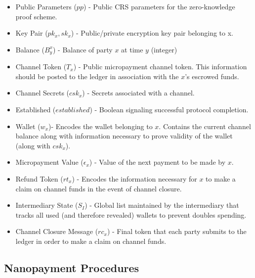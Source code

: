 \documentclass{article}
\begin{document}
\begin{itemize}
\item Public Parameters ($pp$) - Public CRS parameters for the
  zero-knowledge proof scheme.
\item Key Pair ($pk_x, sk_x$) - Public/private encryption key pair belonging to x.
\item Balance ($B^x_y$) - Balance of party $x$ at time $y$ (integer)
\item Channel Token ($T_x$) - Public micropayment channel token. This
  information should be posted to the ledger in association with the
  $x$'s escrowed funds.
\item Channel Secrets ($csk_x$) - Secrets associated with a channel.
\item Established ($established$) - Boolean signaling successful protocol completion.
\item Wallet ($w_x$)- Encodes the wallet belonging to
  $x$. Contains the current channel balance along with information
  necessary to prove validity of the wallet (along with $csk_x$).
\item Micropayment Value ($\epsilon_x$) - Value of the next payment to be
  made by $x$.
\item Refund Token ($rt_x$) - Encodes the information necessary for
  $x$ to make a claim on channel funds in the event of channel closure.
\item Intermediary State ($S_I$) - Global list maintained by the intermediary that
  tracks all used (and therefore revealed) wallets to prevent doubles
  spending.
\item Channel Closure Message ($rc_x$) - Final token that each party
  submits to the ledger in order to make a claim on channel funds.
\end{itemize}

\subsection{Nanopayment Procedures}
\end{document}
